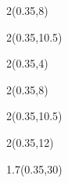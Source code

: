 \begin{textblock*}{2\TPHorizModule}(0.35\TPHorizModule,8\TPVertModule)
  \textcolor{white}{\parttitlefmt}
\end{textblock*}

\begin{textblock*}{2\TPHorizModule}(0.35\TPHorizModule,10.5\TPVertModule)
  \textcolor{white}{\authorfmt}
\end{textblock*}

\null\cleardoublepage


\begin{textblock*}{2\TPHorizModule}(0.35\TPHorizModule,4\TPVertModule)
  \titlefmt
\end{textblock*}

\begin{textblock*}{2\TPHorizModule}(0.35\TPHorizModule,8\TPVertModule)
  \parttitlefmt
\end{textblock*}

\begin{textblock*}{2\TPHorizModule}(0.35\TPHorizModule,10.5\TPVertModule)
  \authorfmt
\end{textblock*}

\begin{textblock*}{2\TPHorizModule}(0.35\TPHorizModule,12\TPVertModule)
  \affiliation
\end{textblock*}

\begin{textblock*}{1.7\TPHorizModule}(0.35\TPHorizModule,30\TPVertModule)
  \edition
\end{textblock*}
\endgroup

